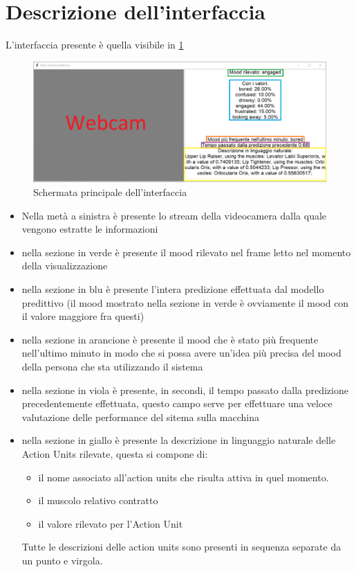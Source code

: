 \section{Descrizione dell’interfaccia}
L’interfaccia presente è quella visibile in \ref{img:9}
\begin{figure}
    \begin{center}    
        \includegraphics[width=0.72\linewidth]{images/image9.png}
        \caption{Schermata principale dell'interfaccia}
        \label{img:9}
    \end{center}
\end{figure}

\begin{itemize}
\item Nella metà a sinistra è presente lo stream della videocamera dalla quale vengono estratte le informazioni
\item nella sezione in verde è presente il mood rilevato nel frame letto nel momento della visualizzazione
\item nella sezione in blu è presente l’intera predizione effettuata dal modello predittivo (il mood mostrato nella sezione in verde è ovviamente il mood con il valore maggiore fra questi)
\item nella sezione in arancione è presente il mood che è stato più frequente nell’ultimo minuto in modo che si possa avere un’idea più precisa del mood della persona che sta utilizzando il sistema
\item nella sezione in viola è presente, in secondi, il tempo passato dalla predizione precedentemente effettuata, questo campo serve per effettuare una veloce valutazione delle performance del sitema sulla macchina
\item nella sezione in giallo è presente la descrizione in linguaggio naturale delle Action Units rilevate, questa si compone di:
\begin{itemize}
\item il nome associato all’action units che risulta attiva in quel momento.
\item il muscolo relativo contratto
\item il valore rilevato per l’Action Unit
\end{itemize}
Tutte le descrizioni delle action units sono presenti in sequenza separate da un punto e virgola.
\end{itemize}

